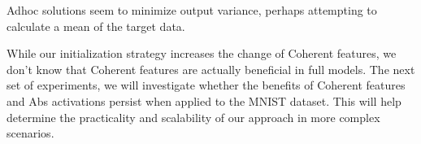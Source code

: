 Adhoc solutions seem to minimize output variance, perhaps attempting to calculate a mean of the target data.

While our initialization strategy increases the change of Coherent features, we don't know that Coherent features are actually beneficial in full models. The next set of experiments, we will investigate whether the benefits of Coherent features and Abs activations persist when applied to the MNIST dataset. This will help determine the practicality and scalability of our approach in more complex scenarios.